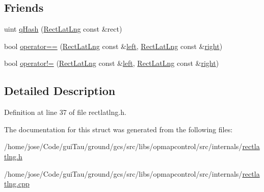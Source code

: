 \subsection*{Friends}
\begin{DoxyCompactItemize}
\item 
uint \hyperlink{group___o_p_map_widget_ga67b89136c8dd499f5081ea9c95aeed4b}{q\-Hash} (\hyperlink{structinternals_1_1_rect_lat_lng}{Rect\-Lat\-Lng} const \&rect)
\item 
bool \hyperlink{group___o_p_map_widget_ga1a6afef3d18a3e0a340d1d9dfe632a6a}{operator==} (\hyperlink{structinternals_1_1_rect_lat_lng}{Rect\-Lat\-Lng} const \&\hyperlink{glext_8h_a85b8f6c07fbc1fb5d77c2ae090f21995}{left}, \hyperlink{structinternals_1_1_rect_lat_lng}{Rect\-Lat\-Lng} const \&\hyperlink{glext_8h_a5ffadbbacc6b89cf6218bc43b384d3fe}{right})
\item 
bool \hyperlink{group___o_p_map_widget_ga3259b80d8473418ef75be3a72b243e2a}{operator!=} (\hyperlink{structinternals_1_1_rect_lat_lng}{Rect\-Lat\-Lng} const \&\hyperlink{glext_8h_a85b8f6c07fbc1fb5d77c2ae090f21995}{left}, \hyperlink{structinternals_1_1_rect_lat_lng}{Rect\-Lat\-Lng} const \&\hyperlink{glext_8h_a5ffadbbacc6b89cf6218bc43b384d3fe}{right})
\end{DoxyCompactItemize}


\subsection{Detailed Description}


Definition at line 37 of file rectlatlng.\-h.



The documentation for this struct was generated from the following files\-:\begin{DoxyCompactItemize}
\item 
/home/jose/\-Code/gui\-Tau/ground/gcs/src/libs/opmapcontrol/src/internals/\hyperlink{rectlatlng_8h}{rectlatlng.\-h}\item 
/home/jose/\-Code/gui\-Tau/ground/gcs/src/libs/opmapcontrol/src/internals/\hyperlink{rectlatlng_8cpp}{rectlatlng.\-cpp}\end{DoxyCompactItemize}
